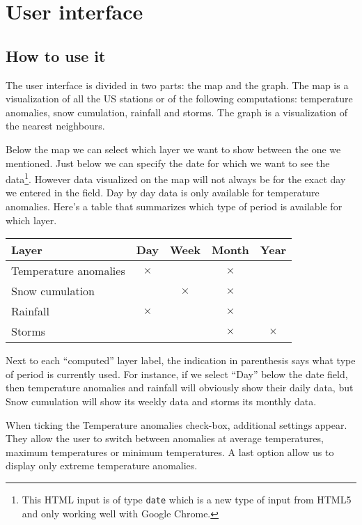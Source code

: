 \section{User interface}
\subsection{How to use it}
The user interface is divided in two parts: the map and the graph. The map is a visualization of all the US stations or of the following computations: temperature anomalies, snow cumulation, rainfall and storms. The graph is a visualization of the nearest neighbours.

Below the map we can select which layer we want to show between the one we mentioned. Just below we can specify the date for which we want to see the data\footnote{This HTML input is of type \texttt{date} which is a new type of input from HTML5 and only working well with Google Chrome.}. However data visualized on the map will not always be for the exact day we entered in the field. Day by day data is only available for temperature anomalies. Here's a table that summarizes which type of period is available for which layer.
\begin{center}
\begin{tabular}{|l|c|c|c|c|}\hline \textbf{Layer} & \textbf{Day} & \textbf{Week} & \textbf{Month} & \textbf{Year} \\\hline Temperature anomalies & $\times$ &  & $\times$ &  \\\hline Snow cumulation &  & $\times$ & $\times$ &  \\\hline Rainfall & $\times$ &  & $\times$ &  \\\hline Storms &  &  & $\times$ & $\times$ \\\hline \end{tabular}
\end{center}

Next to each “computed” layer label, the indication in parenthesis says what type of period is currently used. For instance, if we select “Day” below the date field, then temperature anomalies and rainfall will obviously show their daily data, but Snow cumulation will show its weekly data and storms its monthly data.

When ticking the Temperature anomalies check-box, additional settings appear. They allow the user to switch between anomalies at average temperatures, maximum temperatures or minimum temperatures. A last option allow us to display only extreme temperature anomalies.

